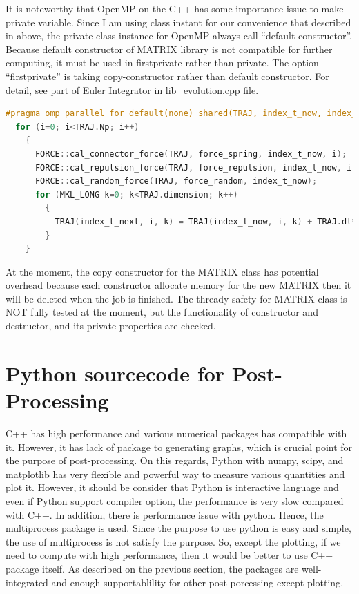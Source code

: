 \documentclass[10pt, a4paper]{article}
\begin{document}
\begin{appendices}
It is noteworthy that OpenMP on the C++ has some importance issue to make private variable. Since I am using class instant for our convenience that described in above, the private class instance for OpenMP always call ``default constructor''. Because default constructor of MATRIX library is not compatible for further computing, it must be used in firstprivate rather than private. The option ``firstprivate'' is taking copy-constructor rather than default constructor.
For detail, see part of Euler Integrator in lib{\_}evolution.cpp file.
\begin{lstlisting}[language=C++,frame=single]
#pragma omp parallel for default(none) shared(TRAJ, index_t_now, index_t_next) firstprivate(force_spring, force_repulsion, force_random)
  for (i=0; i<TRAJ.Np; i++)
    {
      FORCE::cal_connector_force(TRAJ, force_spring, index_t_now, i);
      FORCE::cal_repulsion_force(TRAJ, force_repulsion, index_t_now, i);
      FORCE::cal_random_force(TRAJ, force_random, index_t_now);
      for (MKL_LONG k=0; k<TRAJ.dimension; k++)
        {
          TRAJ(index_t_next, i, k) = TRAJ(index_t_now, i, k) + TRAJ.dt*(force_spring(k) + force_repulsion(k)) + sqrt(TRAJ.dt)*force_random(k);
        }
    }
\end{lstlisting}

At the moment, the copy constructor for the MATRIX class has potential overhead because each constructor allocate memory for the new MATRIX then it will be deleted when the job is finished. The thready safety for MATRIX class is NOT fully tested at the moment, but the functionality of constructor and destructor, and its private properties are checked.

\section{Python sourcecode for Post-Processing}
C++ has high performance and various numerical packages has compatible with it. However, it has lack of package to generating graphs, which is crucial point for the purpose of post-processing. On this regards, Python with numpy, scipy, and matplotlib has very flexible and powerful way to measure various quantities and plot it. However, it should be consider that Python is interactive language and even if Python support compiler option, the performance is very slow compared with C++. In addition, there is performance issue with python. Hence, the multiprocess package is used. Since the purpose to use python is easy and simple, the use of multiprocess is not satisfy the purpose. So, except the plotting, if we need to compute with high performance, then it would be better to use C++ package itself. As described on the previous section, the packages are well-integrated and enough supportablility for other post-porcessing except plotting. 


\end{appendices}
\end{document}
